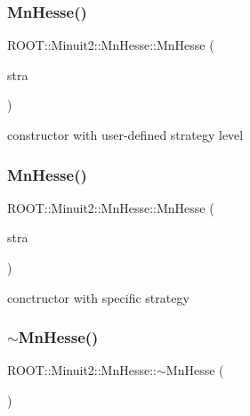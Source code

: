 \subsubsection{\texorpdfstring{MnHesse()}{MnHesse()}\hspace{0.1cm}{\footnotesize\ttfamily [2/6]}}
{\footnotesize\ttfamily R\+O\+O\+T\+::\+Minuit2\+::\+Mn\+Hesse\+::\+Mn\+Hesse (\begin{DoxyParamCaption}\item[{unsigned int}]{stra }\end{DoxyParamCaption})\hspace{0.3cm}{\ttfamily [inline]}}



constructor with user-\/defined strategy level 

\mbox{\label{classROOT_1_1Minuit2_1_1MnHesse_a06f4f5211bf9c85c8a94fe3be518cdeb}} 
\subsubsection{\texorpdfstring{MnHesse()}{MnHesse()}\hspace{0.1cm}{\footnotesize\ttfamily [3/6]}}
{\footnotesize\ttfamily R\+O\+O\+T\+::\+Minuit2\+::\+Mn\+Hesse\+::\+Mn\+Hesse (\begin{DoxyParamCaption}\item[{const \mbox{\hyperlink{classROOT_1_1Minuit2_1_1MnStrategy}{Mn\+Strategy}} \&}]{stra }\end{DoxyParamCaption})\hspace{0.3cm}{\ttfamily [inline]}}



conctructor with specific strategy 

\mbox{\label{classROOT_1_1Minuit2_1_1MnHesse_a7e8672c0a87502a0c75c6c0f9923f7b8}} 
\subsubsection{\texorpdfstring{$\sim$MnHesse()}{~MnHesse()}\hspace{0.1cm}{\footnotesize\ttfamily [1/2]}}
{\footnotesize\ttfamily R\+O\+O\+T\+::\+Minuit2\+::\+Mn\+Hesse\+::$\sim$\+Mn\+Hesse (\begin{DoxyParamCaption}{ }\end{DoxyParamCaption})\hspace{0.3cm}{\ttfamily [inline]}}

